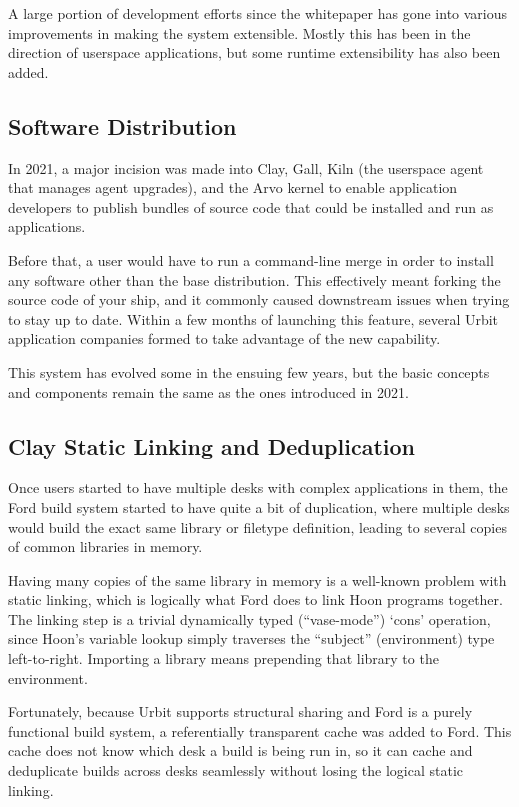 \documentclass[twoside]{article}
\begin{document}
A large portion of development efforts since the whitepaper has gone into various improvements in making the system extensible.  Mostly this has been in the direction of userspace applications, but some runtime extensibility has also been added.

\subsection{Software Distribution}

In 2021, a major incision was made into Clay, Gall, Kiln (the userspace agent that manages agent upgrades), and the Arvo kernel to enable application developers to publish bundles of source code that could be installed and run as applications.

Before that, a user would have to run a command-line merge in order to install any software other than the base distribution.  This effectively meant forking the source code of your ship, and it commonly caused downstream issues when trying to stay up to date.  Within a few months of launching this feature, several Urbit application companies formed to take advantage of the new capability.

This system has evolved some in the ensuing few years, but the basic concepts and components remain the same as the ones introduced in 2021.

\subsection{Clay Static Linking and Deduplication}

Once users started to have multiple desks with complex applications in them, the Ford build system started to have quite a bit of duplication, where multiple desks would build the exact same library or filetype definition, leading to several copies of common libraries in memory.

Having many copies of the same library in memory is a well-known problem with static linking, which is logically what Ford does to link Hoon programs together.  The linking step is a trivial dynamically typed (``vase-mode'') `cons' operation, since Hoon's variable lookup simply traverses the ``subject'' (environment) type left-to-right.  Importing a library means prepending that library to the environment.

Fortunately, because Urbit supports structural sharing and Ford is a purely functional build system, a referentially transparent cache was added to Ford.  This cache does not know which desk a build is being run in, so it can cache and deduplicate builds across desks seamlessly without losing the logical static linking.
\end{document}
